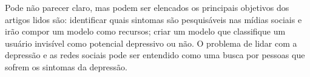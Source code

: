 \documentclass[11pt, notitlepage]{article} %
\begin{document}

Pode não parecer claro, mas podem ser elencados os principais objetivos dos artigos lidos são: identificar quais sintomas são pesquisáveis nas mídias sociais e irão compor um modelo como recursos; criar um modelo que classifique um usuário invisível como potencial depressivo ou não. O problema de lidar com a depressão e as redes sociais pode ser entendido como uma busca por pessoas que sofrem os sintomas da depressão.
\end{document}
